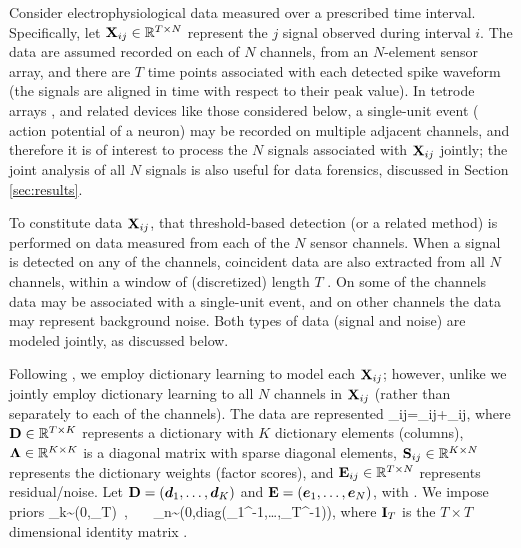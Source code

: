 \documentclass[journal]{IEEEtran}
\newcommand{\Real}{\mathbb{R}}
\begin{document}
Consider electrophysiological data measured over a prescribed time interval. Specifically, let ${\mathbf X}_{ij}\in\mathbb{R}^{T\times N}$ represent the $j$ signal observed during interval $i$. The data are assumed recorded on each of $N$ channels, from an $N$-element sensor array, and there are $T$ time points associated with each detected spike waveform (the signals are aligned in time with respect to their peak value). In tetrode arrays \cite{tetrode}, and related devices like those considered below, a single-unit event ( action potential of a neuron) may be recorded on multiple adjacent channels, and therefore it is of interest to process the $N$ signals associated with ${\mathbf X}_{ij}$ jointly; the joint analysis of all $N$ signals is also useful for data forensics, discussed in Section \ref{sec:results}.

To constitute data ${\mathbf X}_{ij}$,  that threshold-based detection (or a related method) is performed on data measured from each of the $N$ sensor channels. When a signal is detected on any of the channels, coincident data are also extracted from all $N$ channels, within a window of (discretized) length $T$ . On some of the channels data may be associated with a single-unit event, and on other channels the data may represent background noise. Both types of data (signal and noise) are modeled jointly, as discussed below.

Following \cite{Bo2011}, we employ dictionary learning to model each ${\mathbf X}_{ij}$; however, unlike \cite{Bo2011} we jointly employ dictionary learning to all $N$ channels in ${\mathbf X}_{ij}$ (rather than separately to each of the channels). The data are represented
\beq\Xmat_{ij}=\Dmat \Lambdamat \Smat_{ij}+\Emat_{ij},\label{eq:basic}\eeq
where ${\mathbf D}\in\mathbb{R}^{T\times K}$ represents a dictionary with $K$ dictionary elements (columns), $\boldsymbol{\Lambda}\in\mathbb{R}^{K\times K}$ is a diagonal matrix with sparse diagonal elements, ${\mathbf S}_{ij}\in\mathbb{R}^{K\times N}$ represents the dictionary weights (factor scores), and ${\mathbf E}_{ij}\in\mathbb{R}^{T\times N}$ represents residual/noise. Let ${\mathbf D}=(\boldsymbol{d}_1,\dots,\boldsymbol{d}_K)$ and ${\mathbf E}=(\boldsymbol{e}_1,\dots,\boldsymbol{e}_N)$, with . We impose  priors
\beq \dv_k\sim{}(0,\Imat_T)~,~~~ \ev_n\sim{}(0,\mbox{diag}(\eta_1^{-1},\dots,\eta_T^{-1})),\eeq
where ${\mathbf I}_T$ is the $T\times T$ dimensional identity matrix \add{and $\eta_t \in \Real$ for all $t$}.
\end{document}
